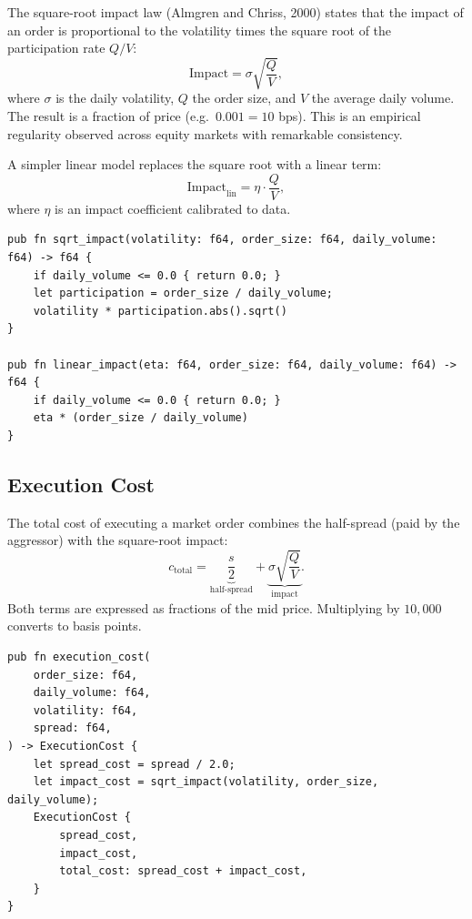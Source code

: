 The square-root impact law (Almgren and Chriss, 2000) states that the
impact of an order is proportional to the volatility times the square
root of the participation rate $Q / V$:
\[
    \text{Impact} = \sigma \sqrt{\frac{Q}{V}},
\]
where $\sigma$ is the daily volatility, $Q$ the order size, and $V$
the average daily volume. The result is a fraction of price (e.g.\
$0.001 = 10$ bps). This is an empirical regularity observed across
equity markets with remarkable consistency.

A simpler linear model replaces the square root with a linear term:
\[
    \text{Impact}_{\text{lin}} = \eta \cdot \frac{Q}{V},
\]
where $\eta$ is an impact coefficient calibrated to data.

\begin{lstlisting}[caption={Square-root and linear impact models}]
pub fn sqrt_impact(volatility: f64, order_size: f64, daily_volume: f64) -> f64 {
    if daily_volume <= 0.0 { return 0.0; }
    let participation = order_size / daily_volume;
    volatility * participation.abs().sqrt()
}

pub fn linear_impact(eta: f64, order_size: f64, daily_volume: f64) -> f64 {
    if daily_volume <= 0.0 { return 0.0; }
    eta * (order_size / daily_volume)
}
\end{lstlisting}

\subsection{Execution Cost}


The total cost of executing a market order combines the half-spread
(paid by the aggressor) with the square-root impact:
\[
    c_{\text{total}} = \underbrace{\frac{s}{2}}_{\text{half-spread}}
                     + \underbrace{\sigma\sqrt{\frac{Q}{V}}}_{\text{impact}}.
\]
Both terms are expressed as fractions of the mid price. Multiplying by
$10{,}000$ converts to basis points.

\begin{lstlisting}[caption={Execution cost combines spread and impact}]
pub fn execution_cost(
    order_size: f64,
    daily_volume: f64,
    volatility: f64,
    spread: f64,
) -> ExecutionCost {
    let spread_cost = spread / 2.0;
    let impact_cost = sqrt_impact(volatility, order_size, daily_volume);
    ExecutionCost {
        spread_cost,
        impact_cost,
        total_cost: spread_cost + impact_cost,
    }
}
\end{lstlisting}


